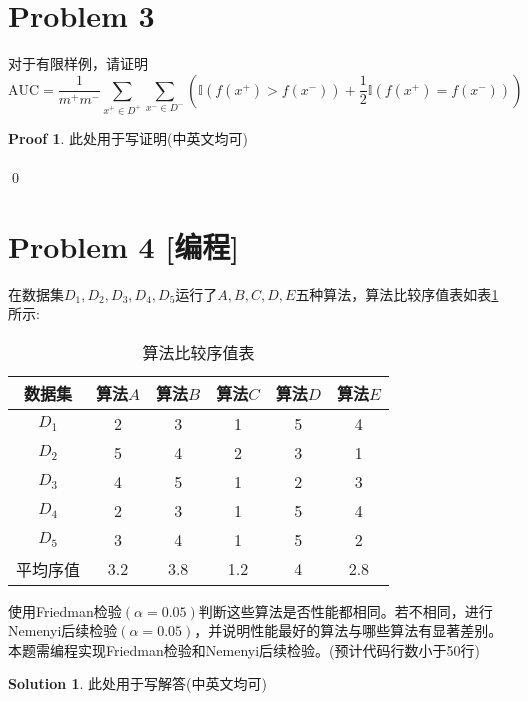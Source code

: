 \documentclass[a4paper,UTF8]{article}
\theoremstyle{definition}
\newtheorem*{solution}{Solution}
\newtheorem*{prove}{Proof}
\begin{document}
\section*{Problem 3}
对于有限样例，请证明
\[
\text{AUC} = \frac{1}{m^+m^-}\sum_{x^+\in D^+}\sum_{x^-\in D^-}\left(\mathbb{I}(f(x^+)>f(x^-))+\frac{1}{2}\mathbb{I}(f(x^+)=f(x^-))\right)
\]

\begin{prove}
此处用于写证明(中英文均可)
~\\
~\\
\qed
\end{prove}

\section*{Problem 4 [编程]} 
在数据集$D_1,D_2,D_3,D_4,D_5$运行了$A,B,C,D,E$五种算法，算法比较序值表如表\ref{table:ranking}所示:
\begin{table}[h]
\centering
\caption{算法比较序值表} \vspace{2mm}\label{table:ranking}
\begin{tabular}{c|c c c c c}\hline
数据集 & 算法$A$ & 算法$B$  & 算法$C$  &算法$D$  &算法$E$ \\
\hline
$D_1$ & 2  & 3 &  1 &  5  & 4\\
$D_2$ & 5  & 4 &  2 &  3  & 1\\
$D_3$ & 4  & 5 &  1 &  2  & 3\\
$D_4$ & 2  & 3 &  1 &  5  & 4\\
$D_5$ & 3  & 4 &  1 &  5  & 2\\
\hline
平均序值 & 3.2 &  3.8 & 1.2 &  4 &  2.8 \\
\hline
\end{tabular}
\end{table}

使用Friedman检验$(\alpha=0.05)$判断这些算法是否性能都相同。若不相同，进行Nemenyi后续检验$(\alpha=0.05)$，并说明性能最好的算法与哪些算法有显著差别。本题需编程实现Friedman检验和Nemenyi后续检验。(预计代码行数小于50行)
\begin{solution}
此处用于写解答(中英文均可)
~\\
~\\
\end{solution}
\end{document}
